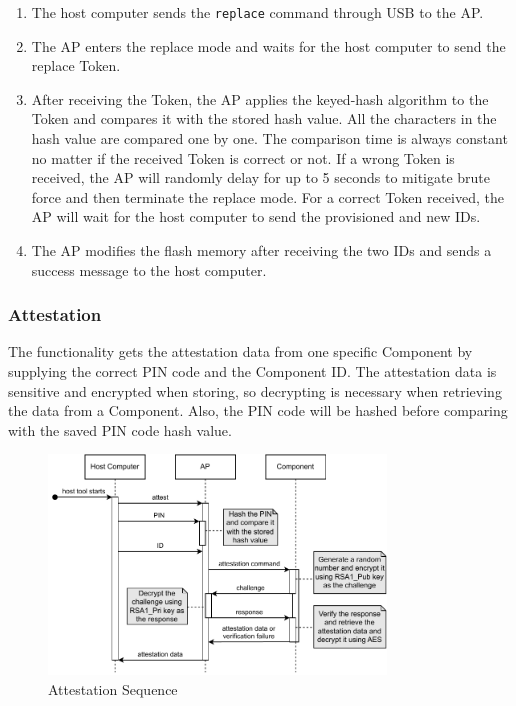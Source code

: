 \documentclass[11pt,oneside,onecolumn,letterpaper]{article}
\newcounter{alg}
\begin{document}
\begin{enumerate}
	\item The host computer sends the \texttt{replace} command through USB to the AP.
	\item The AP enters the replace mode and waits for the host computer to send the replace Token.
	\item After receiving the Token,
	the AP applies the keyed-hash algorithm to the Token and compares it with the stored hash value.
	All the characters in the hash value are compared one by one.
	The comparison time is always constant no matter if the received Token is correct or not.
	If a wrong Token is received,
	the AP will randomly delay for up to 5 seconds to mitigate brute force and then terminate the replace mode.
	For a correct Token received,
	the AP will wait for the host computer to send the provisioned and new IDs.
	\item The AP modifies the flash memory after receiving the two IDs and sends a success message to the host computer.
\end{enumerate}

\subsubsection{Attestation}
The functionality gets the attestation data from one specific Component by supplying the correct PIN code and the Component ID.
The attestation data is sensitive and encrypted when storing,
so decrypting is necessary when retrieving the data from a Component.
Also,
the PIN code will be hashed before comparing with the saved PIN code hash value.

\begin{figure}[h]
	\centering
	\includegraphics[width=0.8\textwidth]{pics/attest.pdf}
	\caption{Attestation Sequence}
	\label{fig:functionality_attest}
\end{figure}
\end{document}

